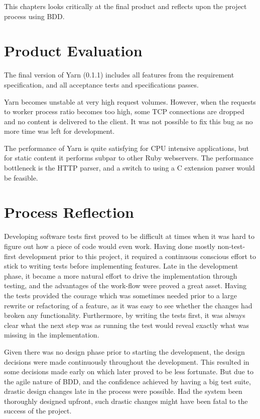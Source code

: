 This chapters looks critically at the final product and reflects upon the
project process using BDD.

\section{Product Evaluation}
The final version of Yarn (0.1.1) includes all features from the requirement
specification, and all acceptance tests and specifications passes. 

Yarn becomes unstable at very high request volumes. However, when the requests to worker
process ratio becomes too high, some TCP connections are dropped and no
content is delivered to the client.  It was not possible to fix this bug as no
more time was left for development.

The performance of Yarn is quite satisfying for CPU intensive applications,
but for static content it performs subpar to other Ruby webservers. The
performance bottleneck is the HTTP parser, and a switch to using a C extension
parser would be feasible.

\section{Process Reflection}
Developing software tests first proved to be difficult at times when it was
hard to figure out how a piece of code would even work. Having done mostly
non-test-first development prior to this project, it required a continuous
conscious effort to stick to writing tests before implementing features. Late
in the development phase, it became a more natural effort to drive the
implementation through testing, and the advantages of the work-flow were proved
a great asset. Having the tests provided the courage which was sometimes
needed prior to a large rewrite or refactoring of a feature, as it was 
easy to see whether the changes had broken any functionality. Furthermore, by writing
the tests first, it was always clear what the next step was as running the
test would reveal exactly what was missing in the implementation.

Given there was no design phase prior to starting the development, the design
decisions were made continuously throughout the development. This resulted in
some decisions made early on which later proved to be less fortunate. But due
to the agile nature of BDD, and the confidence achieved by having a big test
suite, drastic design changes late in the process were possible. Had the
system been thoroughly designed upfront, such drastic changes might have been
fatal to the success of the project.
